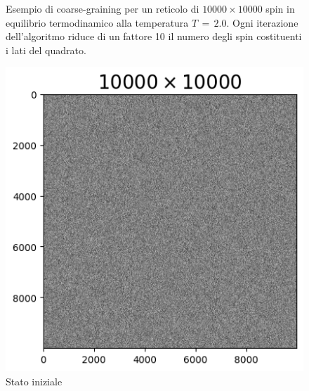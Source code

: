 \begin{figure}[htbp]
    \caption{Esempio di coarse-graining per un reticolo di $10000 \times 10000$ spin in equilibrio termodinamico alla 
    temperatura $T\,=\,2.0$. Ogni iterazione dell'algoritmo riduce di un fattore 10 il numero degli spin costituenti i lati 
    del quadrato.}
    \label{fig: cg_2.0}
\end{figure}

\vspace*{\fill}

\vspace*{\fill}

\begin{figure}[htbp]
    \centering
    \begin{minipage}{0.45\textwidth}  
      \centering
      \includegraphics[page=1, width=\textwidth]{Immagini/simIsing2D/cg/cg_10000_3.0.png}
      \caption{Stato iniziale}
    \end{minipage}\hfill
    \begin{minipage}{0.45\textwidth}  
      \centering

\end{minipage}
\end{figure}
